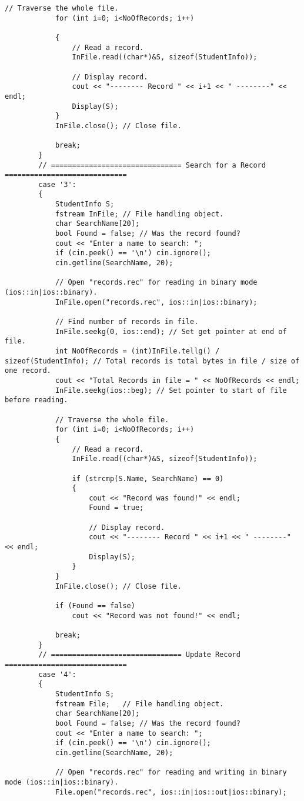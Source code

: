 \documentclass[12pt,a4paper]{article}
\begin{document}
\begin{lstlisting}[caption={Random access in binary file}]
			// Traverse the whole file.
			for (int i=0; i<NoOfRecords; i++)
			
			{
				// Read a record.
				InFile.read((char*)&S, sizeof(StudentInfo));

				// Display record.
				cout << "-------- Record " << i+1 << " --------" << endl;
				Display(S);
			}
			InFile.close();	// Close file.

			break;
		}
		// =============================== Search for a Record =============================
		case '3':
		{
			StudentInfo S;
			fstream InFile;	// File handling object.
			char SearchName[20];
			bool Found = false; // Was the record found?
			cout << "Enter a name to search: ";
			if (cin.peek() == '\n') cin.ignore();
			cin.getline(SearchName, 20);

			// Open "records.rec" for reading in binary mode (ios::in|ios::binary).
			InFile.open("records.rec", ios::in|ios::binary);

			// Find number of records in file.
			InFile.seekg(0, ios::end); // Set get pointer at end of file.
			int NoOfRecords = (int)InFile.tellg() / sizeof(StudentInfo); // Total records is total bytes in file / size of one record.
			cout << "Total Records in file = " << NoOfRecords << endl;
			InFile.seekg(ios::beg); // Set pointer to start of file before reading.

			// Traverse the whole file.
			for (int i=0; i<NoOfRecords; i++)
			{
				// Read a record.
				InFile.read((char*)&S, sizeof(StudentInfo));

				if (strcmp(S.Name, SearchName) == 0)
				{
					cout << "Record was found!" << endl;
					Found = true;

					// Display record.
					cout << "-------- Record " << i+1 << " --------" << endl;
					Display(S);
				}
			}
			InFile.close();	// Close file.

			if (Found == false)
				cout << "Record was not found!" << endl;

			break;
		}
		// =============================== Update Record =============================
		case '4':
		{
			StudentInfo S;
			fstream File;	// File handling object.
			char SearchName[20];
			bool Found = false; // Was the record found?
			cout << "Enter a name to search: ";
			if (cin.peek() == '\n') cin.ignore();
			cin.getline(SearchName, 20);

			// Open "records.rec" for reading and writing in binary mode (ios::in|ios::binary).
			File.open("records.rec", ios::in|ios::out|ios::binary);


\end{lstlisting}
\end{document}
